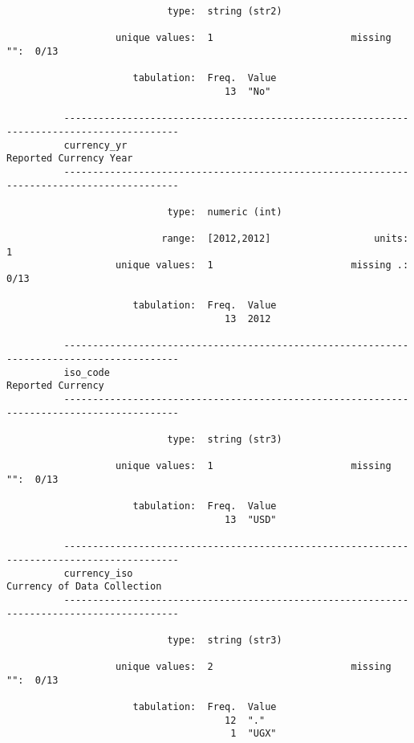 \documentclass{article}
\begin{document}
\begin{verbatim}
                            type:  string (str2)
          
                   unique values:  1                        missing "":  0/13
          
                      tabulation:  Freq.  Value
                                      13  "No"
          
          ------------------------------------------------------------------------------------------
          currency_yr                                                         Reported Currency Year
          ------------------------------------------------------------------------------------------
          
                            type:  numeric (int)
          
                           range:  [2012,2012]                  units:  1
                   unique values:  1                        missing .:  0/13
          
                      tabulation:  Freq.  Value
                                      13  2012
          
          ------------------------------------------------------------------------------------------
          iso_code                                                                 Reported Currency
          ------------------------------------------------------------------------------------------
          
                            type:  string (str3)
          
                   unique values:  1                        missing "":  0/13
          
                      tabulation:  Freq.  Value
                                      13  "USD"
          
          ------------------------------------------------------------------------------------------
          currency_iso                                                   Currency of Data Collection
          ------------------------------------------------------------------------------------------
          
                            type:  string (str3)
          
                   unique values:  2                        missing "":  0/13
          
                      tabulation:  Freq.  Value
                                      12  "."
                                       1  "UGX"
          

\end{verbatim}
\end{document}
